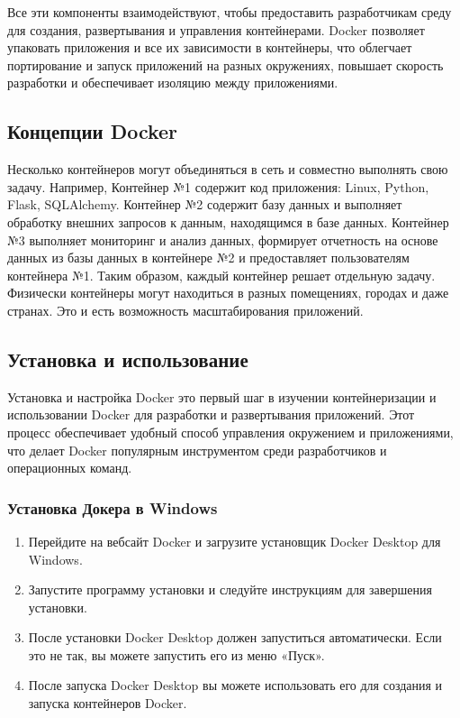 \documentclass[letterpaper,10pt,russian]{sphinxmanual}
\begin{document}
\sphinxAtStartPar
Все эти компоненты взаимодействуют, чтобы предоставить разработчикам среду для создания, развертывания и управления контейнерами. Docker позволяет упаковать приложения и все их зависимости в контейнеры, что облегчает портирование и запуск приложений на разных окружениях, повышает скорость разработки и обеспечивает изоляцию между приложениями.


\subsection{Концепции Docker}
\label{\detokenize{educational_materials/docker_base/content:id4}}
\sphinxAtStartPar
Несколько контейнеров могут объединяться в сеть и совместно выполнять свою задачу. Например, Контейнер №1 содержит код приложения: Linux, Python, Flask, SQLAlchemy. Контейнер №2 содержит базу данных и выполняет обработку внешних запросов к данным, находящимся в базе данных. Контейнер №3 выполняет мониторинг и анализ данных, формирует отчетность на основе данных из базы данных в контейнере №2 и предоставляет пользователям контейнера №1. Таким образом, каждый контейнер решает отдельную задачу. Физически контейнеры могут находиться в разных помещениях, городах и даже странах. Это и есть возможность масштабирования приложений.


\subsection{Установка и использование}
\label{\detokenize{educational_materials/docker_base/content:id5}}
\sphinxAtStartPar
Установка и настройка Docker \sphinxhyphen{} это первый шаг в изучении контейнеризации и использовании Docker для разработки и развертывания приложений. Этот процесс обеспечивает удобный способ управления окружением и приложениями, что делает Docker популярным инструментом среди разработчиков и операционных команд.


\subsubsection{Установка Докера в Windows}
\label{\detokenize{educational_materials/docker_base/content:windows}}\begin{enumerate}
%
\item {} 
\sphinxAtStartPar
Перейдите на веб\sphinxhyphen{}сайт Docker и загрузите установщик Docker Desktop для Windows.

\item {} 
\sphinxAtStartPar
Запустите программу установки и следуйте инструкциям для завершения установки.

\item {} 
\sphinxAtStartPar
После установки Docker Desktop должен запуститься автоматически. Если это не так, вы можете запустить его из меню «Пуск».

\item {} 
\sphinxAtStartPar
После запуска Docker Desktop вы можете использовать его для создания и запуска контейнеров Docker.

\end{enumerate}
\end{document}
